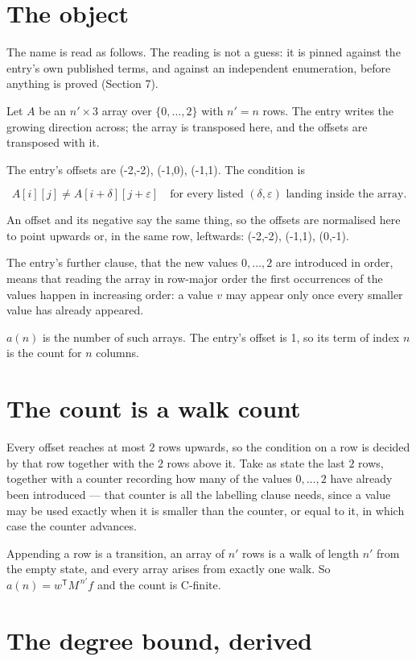 \documentclass[11pt]{article}
\theoremstyle{definition}
\begin{document}
\section{The object}

The name is read as follows. The reading is not a guess: it is pinned against the entry's own published terms, and against an independent enumeration, before anything is proved (Section 7).

Let $A$ be an $n' \times 3$ array over $\{0,\dots,2\}$ with $n' = n$ rows. The entry writes the growing direction across; the array is transposed here, and the offsets are transposed with it.

The entry's offsets are (-2,-2), (-1,0), (-1,1). The condition is

\[A[i][j] \ne A[i{+}\delta][j{+}\varepsilon]\quad\text{for every listed }(\delta,\varepsilon)\text{ landing inside the array.}\]

An offset and its negative say the same thing, so the offsets are normalised here to point upwards or, in the same row, leftwards: (-2,-2), (-1,1), (0,-1).

The entry's further clause, that the new values $0,\dots,2$ are introduced in order, means that reading the array in row-major order the first occurrences of the values happen in increasing order: a value $v$ may appear only once every smaller value has already appeared.

$a(n)$ is the number of such arrays. The entry's offset is 1, so its term of index $n$ is the count for $n$ columns.

\section{The count is a walk count}

Every offset reaches at most $2$ rows upwards, so the condition on a row is decided by that row together with the $2$ rows above it. Take as state the last $2$ rows, together with a counter recording how many of the values $0,\dots,2$ have already been introduced --- that counter is all the labelling clause needs, since a value may be used exactly when it is smaller than the counter, or equal to it, in which case the counter advances.

Appending a row is a transition, an array of $n'$ rows is a walk of length $n'$ from the empty state, and every array arises from exactly one walk. So $a(n) = w^{\mathsf T}M^{\,n'}f$ and the count is C-finite.

\section{The degree bound, derived}
\end{document}
